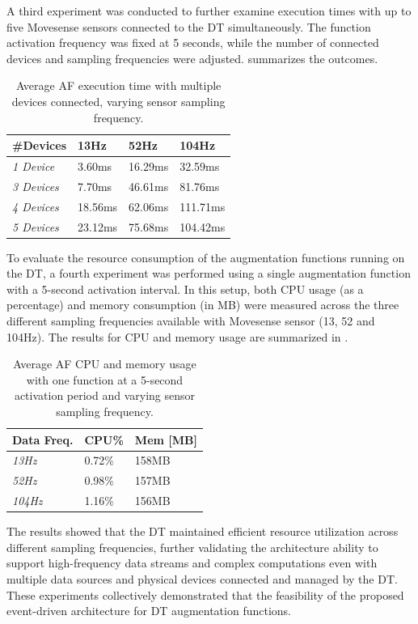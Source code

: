 A third experiment was conducted to further examine execution times with up to five Movesense sensors connected to the DT simultaneously. The function activation frequency was fixed at 5 seconds, while the number of connected devices and sampling frequencies were adjusted.  summarizes the outcomes. 

\begin{table}
    \centering
    \begin{tabular}{p{4cm} p{2cm} p{2cm} p{2cm}}
    \hline
    \textbf{\#Devices} & \textbf{13Hz} & \textbf{52Hz} & \textbf{104Hz} \\ \hline
    \textit{1 Device} & 3.60ms & 16.29ms & 32.59ms \\ \hline
    \textit{3 Devices} & 7.70ms & 46.61ms & 81.76ms \\ \hline
    \textit{4 Devices} & 18.56ms & 62.06ms & 111.71ms \\ \hline
    \textit{5 Devices} & 23.12ms & 75.68ms & 104.42ms \\ \hline\hline
    \end{tabular}
    \caption{Average AF execution time with multiple devices connected, varying sensor sampling frequency.}
    \label{tab:AF_exec_time_multiple_devices}
\end{table}

To evaluate the resource consumption of the augmentation functions running on the DT, a fourth experiment was performed using a single augmentation function with a 5-second activation interval.
In this setup, both CPU usage (as a percentage) and memory consumption (in MB) were measured across the three different sampling frequencies available with Movesense sensor (13, 52 and 104Hz).
%
The results for CPU and memory usage are summarized in . 
%
\begin{table}[t]
    \setlength{\belowcaptionskip}{-6pt}
    \centering
    \begin{tabular}{p{4cm} p{3cm} p{3cm}}
    \hline
    \textbf{Data Freq.} & \textbf{CPU\%} & \textbf{Mem [MB]} \\ \hline
    \textit{13Hz} & 0.72\% & 158MB \\ \hline
    \textit{52Hz} & 0.98\% & 157MB \\ \hline
    \textit{104Hz} & 1.16\% & 156MB \\ \hline\hline
    \end{tabular}
    \caption{Average AF CPU and memory usage with one function at a 5-second activation period and varying sensor sampling frequency.}
    \label{tab:AF_CPU_MEM_usage}
\end{table}
%
The results showed that the DT maintained efficient resource utilization across different sampling frequencies, further validating the architecture ability to support high-frequency data streams and complex computations even with multiple data sources and physical devices connected and managed by the \ac{DT}. These experiments collectively demonstrated that the feasibility of the proposed event-driven architecture for DT augmentation functions.

